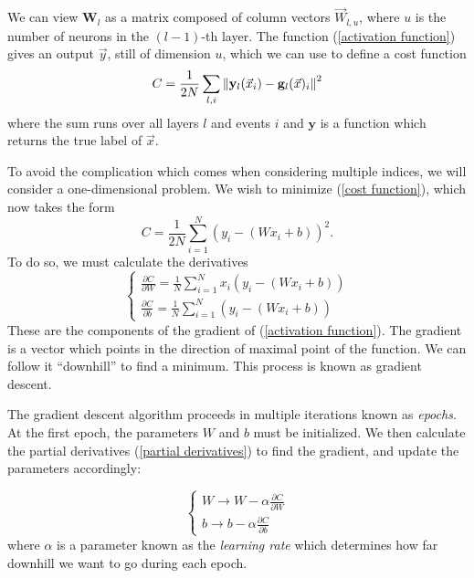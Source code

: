 \documentclass[10pt,a4paper]{book}
\begin{document}
We can view $\mathbf{W}_l$ as a matrix composed of column vectors $\vec{W}_{l,u}$, where $u$ is the number of neurons in the $(l-1)$-th layer. The function (\ref{activation function}) gives an output $\vec{y}$, still of dimension $u$, which we can use to define a cost function
\begin{equation}
C = \frac{1}{2N} \sum_{l, i} \norm{\mathbf{y}_l(\vec{x}_i) - \mathbf{g}_l(\vec{x})_i}^2
\label{cost function}
\end{equation}
where the sum runs over all layers $l$ and events $i$ and $\mathbf{y}$ is a function which returns the true label of $\vec{x}$.

To avoid the complication which comes when considering multiple indices, we will consider a one-dimensional problem. We wish to minimize (\ref{cost function}), which now takes the form
\begin{equation}
C = \frac{1}{2N}\sum_{i = 1}^N (y_i - (Wx_i + b))^2.
\end{equation}
To do so, we must calculate the derivatives
\begin{equation}
\begin{cases}
\frac{\partial C}{\partial W} = \frac{1}{N}\sum_{i = 1}^N x_i(y_i - (Wx_i + b)) \\
\frac{\partial C}{\partial b} = \frac{1}{N}\sum_{i = 1}^N (y_i - (Wx_i + b))
\end{cases}
\label{partial derivatives}
\end{equation}
These are the components of the gradient of (\ref{activation function}). The gradient is a vector which points in the direction of maximal point of the function. We can follow it ``downhill'' to find a minimum. This process is known as gradient descent. 

The gradient descent algorithm proceeds in multiple iterations known as \emph{epochs}. At the first epoch, the parameters $W$ and $b$ must be initialized. We then calculate the partial derivatives (\ref{partial derivatives}) to find the gradient, and update the parameters accordingly:

\begin{equation}
\begin{cases}
W \rightarrow W - \alpha\frac{\partial C}{\partial W} \\
b \rightarrow b - \alpha\frac{\partial C}{\partial b}
\end{cases}
\end{equation}
where $\alpha$ is a parameter known as the \emph{learning rate} which determines how far downhill we want to go during each epoch.
\end{document}
